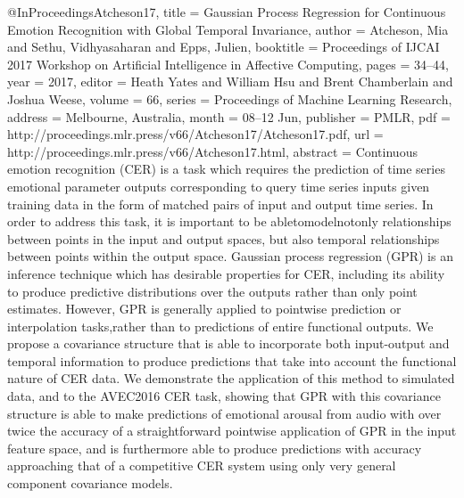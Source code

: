 {@InProceedings{Atcheson17,
  title = {Gaussian Process Regression for Continuous Emotion Recognition with Global Temporal Invariance},
  author = {Atcheson, Mia and Sethu, Vidhyasaharan and Epps, Julien},
  booktitle = {Proceedings of IJCAI 2017 Workshop on Artificial Intelligence in Affective Computing},
  pages = 	 {34--44},
  year = 	 {2017},
  editor =    {Heath Yates and William Hsu and Brent Chamberlain and Joshua Weese},
  volume = 	 {66},
  series = 	 {Proceedings of Machine Learning Research},
  address =  {Melbourne, Australia},
  month = 	 {08--12 Jun},
  publisher = {PMLR},
  pdf = 	 {http://proceedings.mlr.press/v66/Atcheson17/Atcheson17.pdf},
  url = 	 {http://proceedings.mlr.press/v66/Atcheson17.html},
  abstract = {Continuous emotion recognition (CER) is a task which requires the prediction of time series emotional parameter outputs corresponding to query time series inputs given training data in the form of matched pairs of input and output time series. In order to address this task, it is important to be abletomodelnotonly relationships between points in the input and output spaces, but also temporal relationships between points within the output space. Gaussian process regression (GPR) is an inference technique which has desirable properties for CER, including its ability to produce predictive distributions over the outputs rather than only point estimates. However, GPR is generally applied to pointwise prediction or interpolation tasks,rather than to predictions of entire functional outputs. We propose a covariance structure that is able to incorporate both input-output and temporal information to produce predictions that take into account the functional nature of CER data. We demonstrate the application of this method to simulated data, and to the AVEC2016 CER task, showing that GPR with this covariance structure is able to make predictions of emotional arousal from audio with over twice the accuracy of a straightforward pointwise application of GPR in the input feature space, and is furthermore able to produce predictions with accuracy approaching that of a competitive CER system using only very general component covariance models.}
}

}
